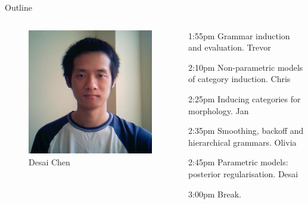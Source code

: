 \documentclass{beamer}
\newenvironment{unpacked_itemize}{
\begin{itemize}
  \setlength{\itemsep}{10pt}
  \setlength{\parskip}{0pt}
  \setlength{\parsep}{0pt}
}{\end{itemize}}
\begin{document}
\begin{frame}[t]{Outline}
\begin{columns}
\begin{column}{0.2\textwidth}
\begin{exampleblock}{}
\begin{figure}
        {\centering \includegraphics[scale=0.10]{desai.jpg}}\\
        Desai Chen\\

      \end{figure}
    \end{exampleblock}
  \end{column}
  \begin{column}{0.7\textwidth}
    \begin{unpacked_itemize}
      \item 1:55pm Grammar induction and evaluation. Trevor
      \item 2:10pm Non-parametric models of category induction. Chris
      \item 2:25pm Inducing categories for morphology. Jan
      \item 2:35pm Smoothing, backoff and hierarchical grammars. Olivia
      \item 2:45pm Parametric models: posterior regularisation. Desai
      \item 3:00pm Break.
    \end{unpacked_itemize}
  \end{column}
\end{columns}
\end{frame}
\end{document}
